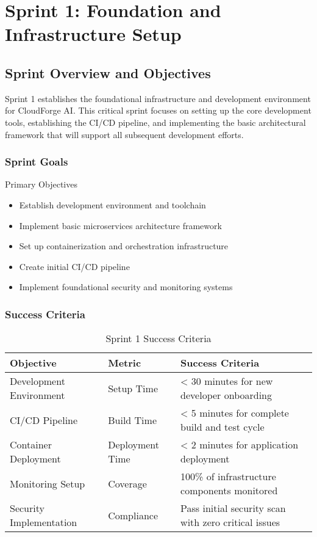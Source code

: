 \chapter{Sprint 1: Foundation and Infrastructure Setup}

\section{Sprint Overview and Objectives}

Sprint 1 establishes the foundational infrastructure and development environment for CloudForge AI. This critical sprint focuses on setting up the core development tools, establishing the CI/CD pipeline, and implementing the basic architectural framework that will support all subsequent development efforts.

\subsection{Sprint Goals}

\begin{sprintbox}{Primary Objectives}
\begin{itemize}
    \item Establish development environment and toolchain
    \item Implement basic microservices architecture framework
    \item Set up containerization and orchestration infrastructure
    \item Create initial CI/CD pipeline
    \item Implement foundational security and monitoring systems
\end{itemize}
\end{sprintbox}

\subsection{Success Criteria}

\begin{table}[H]
\centering
\caption{Sprint 1 Success Criteria}
\begin{tabular}{|p{4cm}|p{3cm}|p{5cm}|}
\hline
\textbf{Objective} & \textbf{Metric} & \textbf{Success Criteria} \\
\hline
Development Environment & Setup Time & < 30 minutes for new developer onboarding \\
\hline
CI/CD Pipeline & Build Time & < 5 minutes for complete build and test cycle \\
\hline
Container Deployment & Deployment Time & < 2 minutes for application deployment \\
\hline
Monitoring Setup & Coverage & 100\% of infrastructure components monitored \\
\hline
Security Implementation & Compliance & Pass initial security scan with zero critical issues \\
\hline
\end{tabular}
\end{table}

